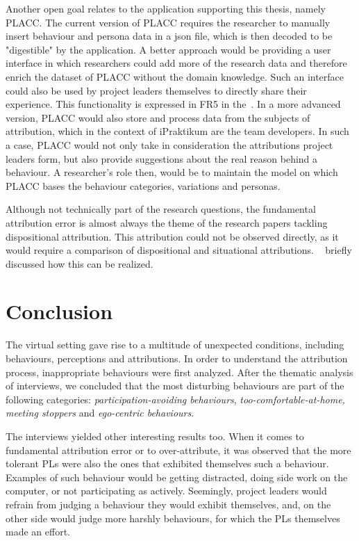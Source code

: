 Another open goal relates to the application supporting this thesis, namely PLACC.  The current version of PLACC requires the researcher to manually insert behaviour and persona data in a json file, which is then decoded to be "digestible" by the application. A better approach would be providing a user interface in which researchers could add more of the research data and therefore enrich the dataset of PLACC without the domain knowledge.  Such an interface could also be used by project leaders themselves to directly share their experience. This functionality is expressed in FR5 in the~.  In a more advanced version, PLACC would also store and process data from the subjects of attribution,  which in the context of iPraktikum are the team developers. In such a case, PLACC would not only take in consideration the attributions project leaders form, but also provide suggestions about the real reason behind a behaviour.  A researcher's role then, would be to maintain the model on which PLACC bases the behaviour categories, variations and personas.

Although not technically part of the research questions, the fundamental attribution error is almost always the theme of the research papers tackling dispositional attribution. This attribution could not be observed directly, as it would require a comparison of dispositional and situational attributions. ~ briefly discussed how this can be realized.

\section{Conclusion}


The virtual setting gave rise to a multitude of unexpected conditions, including behaviours, perceptions and attributions.  In order to understand the attribution process, inappropriate behaviours were first analyzed.  After the thematic analysis of interviews, we concluded that the most disturbing behaviours are part of the following categories: \textit{participation-avoiding behaviours}, \textit{too-comfortable-at-home,} \textit{meeting stoppers} and \textit{ego-centric behaviours}. 

The interviews yielded other interesting results too. When it comes to fundamental attribution error or to over-attribute,  it was observed that the more tolerant PLs were also the ones that exhibited themselves such a behaviour.  Examples of such behaviour would be getting distracted, doing side work on the computer,  or not participating as actively.  Seemingly,  project leaders would refrain from judging a behaviour they would exhibit themselves, and, on the other side would judge more harshly behaviours, for which the PLs themselves made an effort. 

